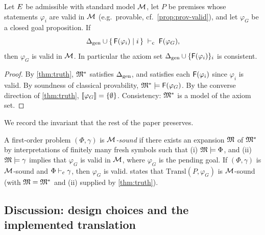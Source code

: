 \begin{theorem}
\label{thm:base-soundness}
Let $E$ be admissible with standard model $\mathcal{M}$, let $P$ be
premises whose statements $\varphi_i$ are valid in $\mathcal{M}$ (e.g.\
provable, cf.\ \cref{prop:prov-valid}), and let $\varphi_G$ be a
closed goal proposition.  If
\[
  \Delta_{\mathrm{gen}} \cup \{\,\mathsf{F}(\varphi_i) \mid i\,\} \;\vdash_{\mathrm{c}}\;
  \mathsf{F}(\varphi_G),
\]
then $\varphi_G$ is valid in $\mathcal{M}$.  In particular the axiom set
$\Delta_{\mathrm{gen}} \cup \{\mathsf{F}(\varphi_i)\}_i$ is consistent.
\end{theorem}

\begin{proof}
By \cref{thm:truth}, $\mathfrak{M}^{*}$ satisfies $\Delta_{\mathrm{gen}}$, and
satisfies each $\mathsf{F}(\varphi_i)$ since $\varphi_i$ is valid.  By
soundness of classical provability, $\mathfrak{M}^{*} \models
\mathsf{F}(\varphi_G)$.  By the converse direction of \cref{thm:truth},
$[\![ \varphi_G ]\!] = \{\emptyset\}$.  Consistency: $\mathfrak{M}^{*}$ is a model of
the axiom set.
\end{proof}

We record the invariant that the rest of the paper preserves.

\begin{definition}
\label{def:si}
A first-order problem $(\Phi, \gamma)$ is \emph{$\mathcal{M}$-sound} if
there exists an expansion $\mathfrak{M}$ of $\mathfrak{M}^{*}$ by interpretations of
finitely many fresh symbols such that (i) $\mathfrak{M} \models \Phi$, and
(ii) $\mathfrak{M} \models \gamma$ implies that $\varphi_G$ is valid in
$\mathcal{M}$, where $\varphi_G$ is the pending goal.  If $(\Phi, \gamma)$
is $\mathcal{M}$-sound and $\Phi \vdash_{\mathrm{c}} \gamma$, then $\varphi_G$ is
valid.  \Cref{thm:base-soundness} states that
$\mathrm{Transl}(P, \varphi_G)$ is $\mathcal{M}$-sound (with $\mathfrak{M} =
\mathfrak{M}^{*}$ and (ii) supplied by \cref{thm:truth}).
\end{definition}

\subsection{Discussion: design choices and the implemented translation}
\label{sec:transl-discussion}

